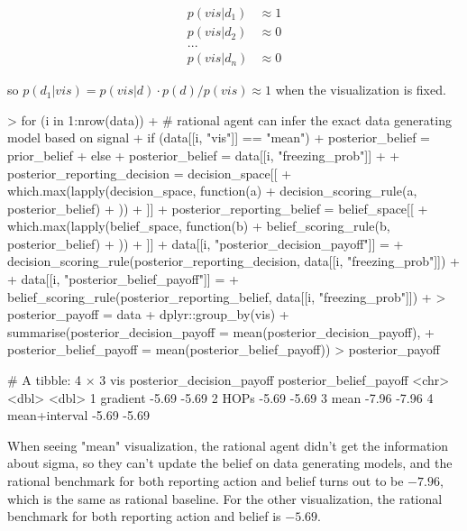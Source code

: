 \documentclass{article}
\begin{document}
\begin{align*}
    p(vis|d_1) &\approx 1\\
    p(vis|d_2) &\approx 0\\
    ...&\\
    p(vis|d_n) &\approx 0
\end{align*}

so $p(d_1|vis) = p(vis|d) \cdot p(d) / p(vis) \approx 1$ when the visualization is fixed.

\begin{Schunk}
\begin{Sinput}
> for (i in 1:nrow(data)) {
+   # rational agent can infer the exact data generating model based on signal
+   if (data[[i, "vis"]] == "mean") {
+     posterior_belief = prior_belief
+   } else {
+     posterior_belief = data[[i, "freezing_prob"]]
+   }
+   posterior_reporting_decision = decision_space[[
+     which.max(lapply(decision_space, function(a) {
+       decision_scoring_rule(a, posterior_belief)
+     }))
+   ]]
+   posterior_reporting_belief = belief_space[[
+     which.max(lapply(belief_space, function(b) {
+       belief_scoring_rule(b, posterior_belief)
+     }))
+   ]]
+   data[[i, "posterior_decision_payoff"]] = 
+     decision_scoring_rule(posterior_reporting_decision, data[[i, "freezing_prob"]])
+   
+   data[[i, "posterior_belief_payoff"]] = 
+     belief_scoring_rule(posterior_reporting_belief, data[[i, "freezing_prob"]])
+ }
> posterior_payoff = data %>%
+   dplyr::group_by(vis) %>%
+   summarise(posterior_decision_payoff = mean(posterior_decision_payoff),
+             posterior_belief_payoff = mean(posterior_belief_payoff))
> posterior_payoff
\end{Sinput}
\begin{Soutput}
# A tibble: 4 × 3
  vis           posterior_decision_payoff posterior_belief_payoff
  <chr>                             <dbl>                   <dbl>
1 gradient                          -5.69                   -5.69
2 HOPs                              -5.69                   -5.69
3 mean                              -7.96                   -7.96
4 mean+interval                     -5.69                   -5.69
\end{Soutput}
\end{Schunk}

When seeing "mean" visualization, the rational agent didn't get the information about sigma, so they can't update the belief on data generating models, and the rational benchmark for both reporting action and belief turns out to be $-7.96$, which is the same as rational baseline. For the other visualization, the rational benchmark for both reporting action and belief is $-5.69$.
\end{document}
